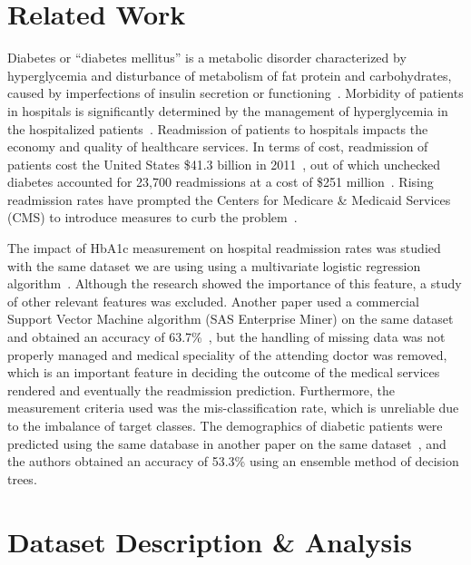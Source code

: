 \documentclass[conference]{IEEEtran}
\begin{document}
\section{Related Work}

Diabetes or “diabetes mellitus” is a metabolic disorder characterized by hyperglycemia and disturbance of metabolism of fat protein and carbohydrates, caused by imperfections of insulin secretion or functioning~\cite{worldhealthorganization-2015}. Morbidity of patients in hospitals is significantly determined by the management of hyperglycemia in the hospitalized patients~\cite{hyperglycemia-2002, unrecognizeddiabetes-1998}. Readmission of patients to hospitals impacts the economy and quality of healthcare services. In terms of cost, readmission of patients cost the United States \$41.3 billion in 2011~\cite{missing}, out of which unchecked diabetes accounted for 23,700 readmissions at a cost of \$251 million~\cite{missing}. Rising readmission rates have prompted the Centers for Medicare \& Medicaid Services (CMS) to introduce measures to curb the problem~\cite{readmissionreduction-2015}.

The impact of HbA1c measurement on hospital readmission rates was studied with the same dataset we are using using a multivariate logistic regression algorithm~\cite{hba1c-2014}. Although the research showed the importance of this feature, a study of other relevant features was excluded. Another paper used a commercial Support Vector Machine algorithm (SAS Enterprise Miner) on the same dataset and obtained an accuracy of 63.7\%~\cite{missing (sas paper)}, but the handling of missing data was not properly managed and medical speciality of the attending doctor was removed, which is an important feature in deciding the outcome of the medical services rendered and eventually the readmission prediction. Furthermore, the measurement criteria used was the mis-classification rate, which is unreliable due to the imbalance of target classes. The demographics of diabetic patients were predicted using the same database in another paper on the same dataset~\cite{missing}, and the authors obtained an accuracy of 53.3\% using an ensemble method of decision trees.

\section{Dataset Description \& Analysis}

\end{document}
